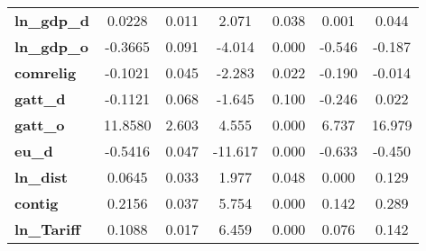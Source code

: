 \begin{center}
\begin{tabular}{lcccccc}
\textbf{ln\_gdp\_d}                                                &       0.0228  &        0.011     &     2.071  &         0.038        &        0.001    &        0.044     \\
\textbf{ln\_gdp\_o}                                                &      -0.3665  &        0.091     &    -4.014  &         0.000        &       -0.546    &       -0.187     \\
\textbf{comrelig}                                                  &      -0.1021  &        0.045     &    -2.283  &         0.022        &       -0.190    &       -0.014     \\
\textbf{gatt\_d}                                                   &      -0.1121  &        0.068     &    -1.645  &         0.100        &       -0.246    &        0.022     \\
\textbf{gatt\_o}                                                   &      11.8580  &        2.603     &     4.555  &         0.000        &        6.737    &       16.979     \\
\textbf{eu\_d}                                                     &      -0.5416  &        0.047     &   -11.617  &         0.000        &       -0.633    &       -0.450     \\
\textbf{ln\_dist}                                                  &       0.0645  &        0.033     &     1.977  &         0.048        &        0.000    &        0.129     \\
\textbf{contig}                                                    &       0.2156  &        0.037     &     5.754  &         0.000        &        0.142    &        0.289     \\
\textbf{ln\_Tariff}                                                &       0.1088  &        0.017     &     6.459  &         0.000        &        0.076    &        0.142     \\
\bottomrule
\end{tabular}
\end{center}